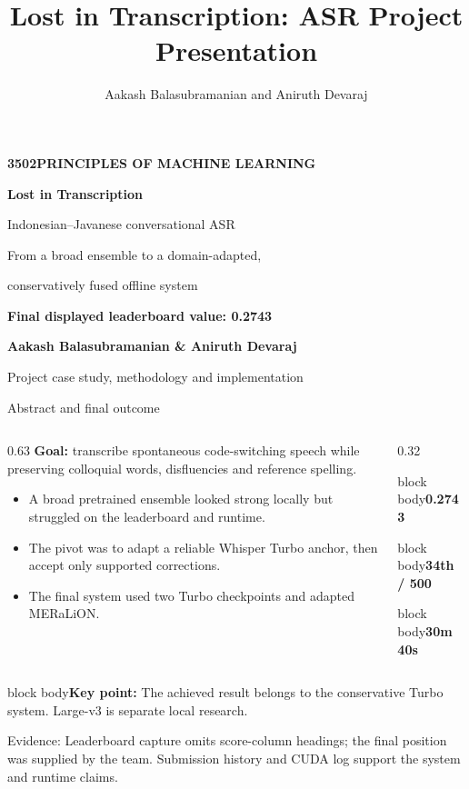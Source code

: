 \documentclass[aspectratio=169,11pt]{beamer}
\title{Lost in Transcription: ASR Project Presentation}
\author{Aakash Balasubramanian and Aniruth Devaraj}
\newcommand{\takeaway}[1]{\vfill\begin{beamercolorbox}[sep=2mm,wd=\linewidth]{block body}\small\textbf{Key point:} #1\end{beamercolorbox}}
\newcommand{\evidence}[1]{\vspace{1mm}\par{\tiny\color{slate}Evidence: #1\par}}
\newcommand{\metric}[2]{\begin{beamercolorbox}[sep=3mm,center,wd=\linewidth]{block body}{\LARGE\bfseries\color{teal}#1}\par\vspace{1mm}{\small #2}\end{beamercolorbox}}
\begin{document}
\begin{frame}[plain]
\vspace{5mm}
{\color{teal}\small\bfseries 3502\quad PRINCIPLES OF MACHINE LEARNING}\par
\vspace{7mm}
{\fontsize{29}{33}\selectfont\bfseries Lost in Transcription}\par
\vspace{3mm}
{\Large Indonesian--Javanese conversational ASR}\par
\vspace{5mm}
{\normalsize From a broad ensemble to a domain-adapted,\par conservatively fused offline system}\par
\vspace{6mm}
{\color{teal}\Large\bfseries Final displayed leaderboard value: 0.2743}\par
\vfill
{\normalsize\bfseries Aakash Balasubramanian \& Aniruth Devaraj}\par
\vspace{2mm}
{\small\color{slate}Project case study, methodology and implementation}\par
\vspace{5mm}
\end{frame}

\begin{frame}{Abstract and final outcome}
\begin{columns}[T]
\begin{column}{0.63\textwidth}
\textbf{Goal:} transcribe spontaneous code-switching speech while preserving colloquial words, disfluencies and reference spelling.
\vspace{3mm}
\begin{itemize}\item A broad pretrained ensemble looked strong locally but struggled on the leaderboard and runtime.
\item The pivot was to adapt a reliable Whisper Turbo anchor, then accept only supported corrections.
\item The final system used two Turbo checkpoints and adapted MERaLiON.
\end{itemize}
\end{column}
\begin{column}{0.32\textwidth}
\metric{0.2743}{Final displayed value; metric label unavailable}
\vspace{3mm}\metric{34th / 500}{Team-reported final position}
\vspace{3mm}\metric{30m 40s}{Measured CUDA inference}
\end{column}
\end{columns}
\takeaway{The achieved result belongs to the conservative Turbo system. Large-v3 is separate local research.}
\evidence{Leaderboard capture omits score-column headings; the final position was supplied by the team. Submission history and CUDA log support the system and runtime claims.}
\end{frame}
\end{document}
